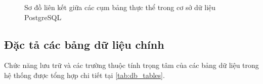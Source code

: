 \begin{figure}[htbp]
{%
}
\caption{Sơ đồ liên kết giữa các cụm bảng thực thể trong cơ sở dữ liệu PostgreSQL}
\label{fig:erd}
\end{figure}

\subsection{Đặc tả các bảng dữ liệu chính}
\label{subsec:dac_ta_bang}

Chức năng lưu trữ và các trường thuộc tính trọng tâm của các bảng dữ liệu trong hệ thống được tổng hợp chi tiết tại \cref{tab:db_tables}.

